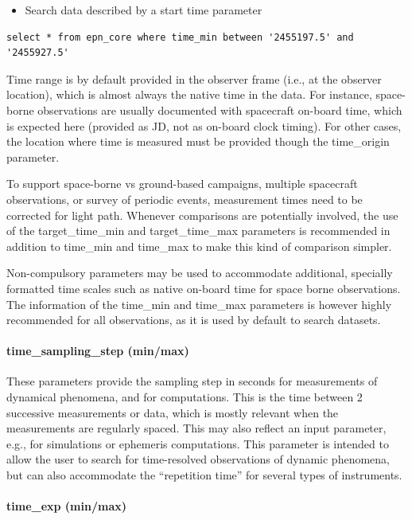 \documentclass[11pt,a4paper]{ivoa}
\begin{document}
\begin{itemize}
\item Search data described by a start time parameter
\end{itemize}

\begin{verbatim}
select * from epn_core where time_min between '2455197.5' and '2455927.5'
\end{verbatim}

Time range is by default provided in the observer frame (i.e., at the observer location), which is almost always the native time in the data. For instance, space-borne observations are usually documented with spacecraft on-board time, which is expected here (provided as JD, not as on-board clock timing). For other cases, the location where time is measured must be provided though the time\_origin parameter.

To support space-borne vs ground-based campaigns, multiple spacecraft observations, or survey of periodic events, measurement times need to be corrected for light path. Whenever comparisons are potentially involved, the use of the target\_time\_min and target\_time\_max parameters is recommended in addition to time\_min and time\_max to make this kind of comparison simpler.

Non-compulsory parameters may be used to accommodate additional, specially formatted time scales such as native on-board time for space borne observations. The information of the time\_min and time\_max parameters is however highly recommended for all observations, as it is used by default to search datasets.

\paragraph{time\_sampling\_step (min/max)}

These parameters provide the sampling step in seconds for measurements of dynamical phenomena, and for computations. This is the time between 2 successive measurements or data, which is mostly relevant when the measurements are regularly spaced. This may also reflect an input parameter, e.g., for simulations or ephemeris computations. This parameter is intended to allow the user to search for time-resolved observations of dynamic phenomena, but can also accommodate the ``repetition time'' for several types of instruments.

\paragraph{time\_exp (min/max)}
\end{document}
